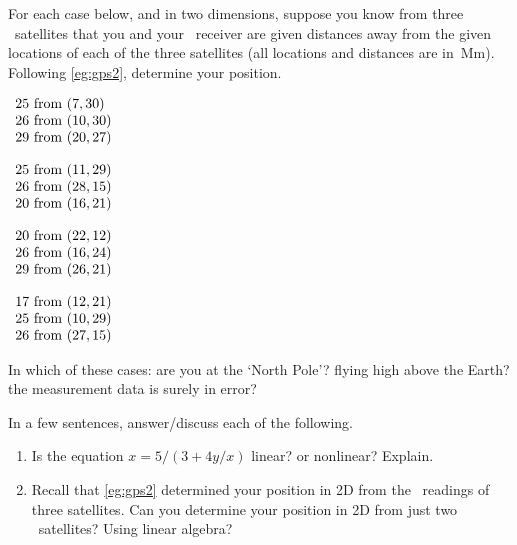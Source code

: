 \begin{exercise} \label{ex:gps2} 
For each case below, and in two dimensions, suppose you know from three \gps\ satellites that you and your \gps\ receiver are given distances away from the given locations of each of the three satellites (all locations and distances are in~Mm).  
Following \cref{eg:gps2}, determine your position.  
\begin{Parts}
\item \(\begin{array}{r@{\text{ from }}l}
25&(7,30)\\26&(10,30)\\29&(20,27)
\end{array}\)

\item \(\begin{array}{r@{\text{ from }}l}
25&(11,29)\\26&(28,15)\\20&(16,21)
\end{array}\)

\item \(\begin{array}{r@{\text{ from }}l}
20&(22,12)\\26&(16,24)\\29&(26,21)
\end{array}\)

\item \(\begin{array}{r@{\text{ from }}l}
17&(12,21)\\25&(10,29)\\26&(27,15)
\end{array}\)

\end{Parts}
In which of these cases: are you at the `North Pole'?  flying high above the Earth?  the measurement data is surely in error?
\end{exercise}



\begin{exercise}  
In a few sentences, answer\slash discuss each of the following.
\begin{enumerate}
\item Is the equation \(x=5/(3+4y/x)\) linear? or nonlinear? Explain.

\item Recall that \cref{eg:gps2} determined your position in 2D from the \gps\ readings of three satellites.  Can you determine your position in 2D from just two \gps\ satellites?  Using linear algebra?

\end{enumerate}
\end{exercise}


